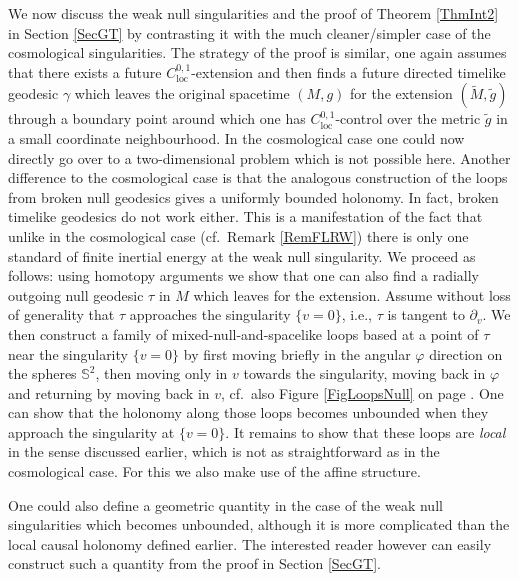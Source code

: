\documentclass[reqno]{article}
\newcommand{\loc}{\mathrm{loc}}
\newcommand{\rd}{\partial}
\begin{document}
We now discuss the weak null singularities and the proof of Theorem \ref{ThmInt2} in Section \ref{SecGT} by contrasting it with the much cleaner/simpler case of the cosmological singularities. The strategy of the proof is similar, one again assumes that there exists a future $C^{0,1}_{\loc}$-extension and then finds a future directed timelike geodesic $\gamma$ which leaves the original spacetime $(M,g)$ for the extension $(\tilde{M}, \tilde{g})$ through a boundary point around which one has $C^{0,1}_{\loc}$-control over the metric $\tilde{g}$ in a small coordinate neighbourhood. In the cosmological case one could now directly go over to a two-dimensional problem which is not possible here. Another difference to the cosmological case is that the analogous construction of the loops from broken null geodesics gives a uniformly bounded holonomy. In fact, broken timelike geodesics do not work either. This is a manifestation of the fact that unlike in the cosmological case (cf.\ Remark \ref{RemFLRW}) there is only one standard of finite inertial energy at the weak null singularity. We proceed as follows: using homotopy arguments we show that one can also find a radially outgoing null geodesic $\tau$ in $M$ which leaves for the extension. Assume without loss of generality that $\tau$ approaches the singularity $\{v = 0\}$, i.e., $\tau$ is tangent to $\rd_v$. We then construct a family of mixed-null-and-spacelike loops based at a point of $\tau$ near the singularity $\{v=0\}$ by first moving briefly in the angular $\varphi$ direction on the spheres $\mathbb{S}^2$, then moving only in $v$ towards the singularity, moving back in $\varphi$ and returning by moving back in $v$, cf.\ also Figure \ref{FigLoopsNull} on page \pageref{FigLoopsNull}. One can show that the holonomy along those loops becomes unbounded when they approach the singularity at $\{v = 0\}$. It remains to show that these loops are \emph{local} in the sense discussed earlier, which is not as straightforward as in the cosmological case. For this we also make use of the affine structure. 

One could also define a geometric quantity in the case of the weak null singularities which becomes unbounded, although it is more complicated than the local causal holonomy defined earlier. The interested reader however can easily construct such a quantity from the proof in Section \ref{SecGT}.
\newline
\end{document}

